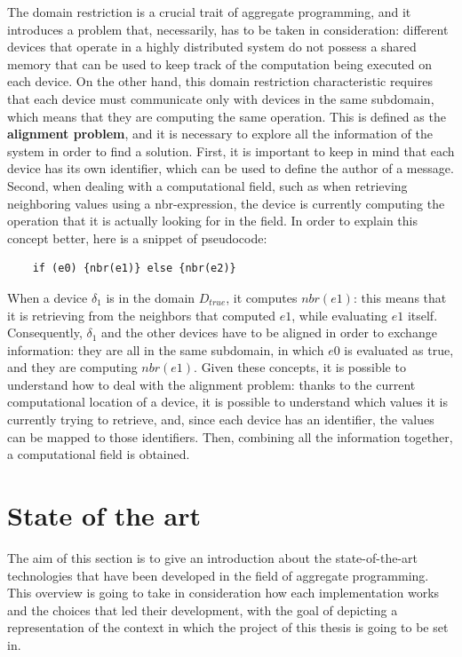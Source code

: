 The domain restriction is a crucial trait of aggregate programming, and it introduces a problem that, necessarily, has to be taken in consideration: different devices that operate in a highly distributed system do not possess a shared memory that can be used to keep track of the computation being executed on each device. On the other hand, this domain restriction characteristic requires that each device must communicate only with devices in the same subdomain, which means that they are computing the same operation.\newline
This is defined as the \textbf{alignment problem}, and it is necessary to explore all the information of the system in order to find a solution. First, it is important to keep in mind that each device has its own identifier, which can be used to define the author of a message. Second, when dealing with a computational field, such as when retrieving neighboring values using a nbr-expression, the device is currently computing the operation that it is actually looking for in the field.\newline
In order to explain this concept better, here is a snippet of pseudocode:
\begin{lstlisting}
    if (e0) {nbr(e1)} else {nbr(e2)}
\end{lstlisting}
When a device $\delta_1$ is in the domain $D_{true}$, it computes $nbr(e1)$: this means that it is retrieving from the neighbors that computed $e1$, while evaluating $e1$ itself.\newline
Consequently, $\delta_1$ and the other devices have to be aligned in order to exchange information: they are all in the same subdomain, in which $e0$ is evaluated as true, and they are computing $nbr(e1)$.\newline
Given these concepts, it is possible to understand how to deal with the alignment problem: thanks to the current computational location of a device, it is possible to understand which values it is currently trying to retrieve, and, since each device has an identifier, the values can be mapped to those identifiers. Then, combining all the information together, a computational field is obtained.

\section{State of the art}
The aim of this section is to give an introduction about the state-of-the-art technologies that have been developed in the field of aggregate programming. This overview is going to take in consideration how each implementation works and the choices that led their development, with the goal of depicting a representation of the context in which the project of this thesis is going to be set in.

